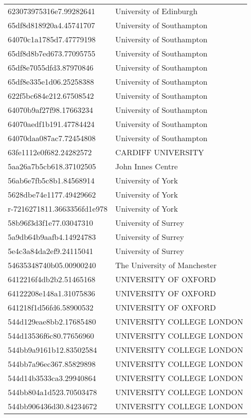 \begin{tabular}{ll}
623073975316e7.99282641 & University of Edinburgh \\
65df8d818920a4.45741707 & University of Southampton \\
64070c1a1785d7.47779198 & University of Southampton \\
65df8d8b7ed673.77095755 & University of Southampton \\
65df8e7055dfd3.87970846 & University of Southampton \\
65df8e335e1d06.25258388 & University of Southampton \\
622f5bc684e212.67508542 & University of Southampton \\
64070b9af27f98.17663234 & University of Southampton \\
64070aedf1b191.47784424 & University of Southampton \\
64070daa087ac7.72454808 & University of Southampton \\
63fe1112e0f682.24282572 & CARDIFF UNIVERSITY \\
5aa26a7b5cb618.37102505 & John Innes Centre \\
56ab6e7fb5c8b1.84568914 & University of York \\
5628dbe74e1177.49429662 & University of York \\
r-7216271811.3663356fd1e978 & University of York \\
58b96f3d3f1e77.03047310 & University of Surrey \\
5a9db64b9aafb4.14924783 & University of Surrey \\
5e4c3a84da2ef9.24115041 & University of Surrey \\
54635348740b05.00900240 & The University of Manchester \\
6412216f4db2b2.51465168 & UNIVERSITY OF OXFORD \\
64122208e148a1.31075836 & UNIVERSITY OF OXFORD \\
641218f1d56fd6.58900532 & UNIVERSITY OF OXFORD \\
544d129eae8bb2.17685480 & UNIVERSITY COLLEGE LONDON \\
544d13536f6c80.77656960 & UNIVERSITY COLLEGE LONDON \\
544bb9a9161b12.83502584 & UNIVERSITY COLLEGE LONDON \\
544bb7a96ec367.85829898 & UNIVERSITY COLLEGE LONDON \\
544d14b3533ca3.29940864 & UNIVERSITY COLLEGE LONDON \\
544bb804a1d523.70503478 & UNIVERSITY COLLEGE LONDON \\
544bb906436d30.84234672 & UNIVERSITY COLLEGE LONDON \\

\end{tabular}
